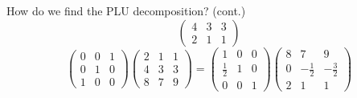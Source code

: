\documentclass[handout]{beamer}
\begin{document}
\begin{frame}{How do we find the PLU decomposition? (cont.)}
\[\begin{pmatrix}{}
                4 & 3 & 3 \\
                2 & 1 & 1
            \end{pmatrix}
            \]
            \[
  \begin{pmatrix}{}
                0 & 0 & 1 \\
                0 & 1 & 0 \\
                1 & 0 & 0
            \end{pmatrix}\begin{pmatrix}{}
                2 & 1 & 1 \\
                4 & 3 & 3 \\
                8 & 7 & 9
            \end{pmatrix}
            =\begin{pmatrix}{}
                1 & 0 & 0 \\
                \frac{1}{2} & 1 & 0 \\
                0 & 0 & 1
            \end{pmatrix}
            \begin{pmatrix}{}
                8 & 7 & 9 \\
                0 & -\frac{1}{2} & -\frac{3}{2} \\
                2 & 1 & 1
            \end{pmatrix}
            \]

\end{frame}
\end{document}
